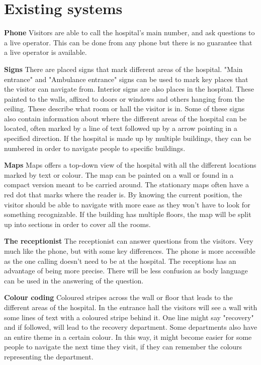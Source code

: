 \section{Existing systems} %
\label{sec:existing_systems}


\textbf{Phone}
Visitors are able to call the hospital's main number, and ask questions to a live operator. This can be done from any phone but there is no guarantee that a live operator is available.

\textbf{Signs}
There are placed signs that mark different areas of the hospital. "Main entrance" and "Ambulance entrance" signs can be used to mark key places that the visitor can navigate from.
Interior signs are also places in the hospital. These painted to the walls, affixed to doors or windows and others hanging from the ceiling. These describe what room or hall the visitor is in. Some of these signs also contain information about where the different areas of the hospital can be located, often marked by a line of text followed up by a arrow pointing in a specified direction. If the hospital is made up by multiple buildings, they can be numbered in order to navigate people to specific buildings.

\textbf{Maps}
Maps offers a top-down view of the hospital with all the different locations marked by text or colour. The map can be painted on a wall or found in a compact version meant to be carried around. The stationary maps often have a red dot that marks where the reader is. By knowing the current position, the visitor should be able to navigate with more ease as they won't have to look for something recognizable. If the building has multiple floors, the map will be split up into sections in order to cover all the rooms.

\textbf{The receptionist}
The receptionist can answer questions from the visitors. Very much like the phone, but with some key differences. The phone is more accessible as the one calling doesn't need to be at the hospital. The receptions has an advantage of being more precise. There will be less confusion as body language can be used in the answering of the question.

\textbf{Colour coding}
Coloured stripes across the wall or floor that leads to the different areas of the hospital. In the entrance hall the visitors will see a wall with some lines of text with a coloured stripe behind it. One line might say "recovery" and if followed, will lead to the recovery department. Some departments also have an entire theme in a certain colour. In this way, it might become easier for some people to navigate the next time they visit, if they can remember the colours representing the department. 

